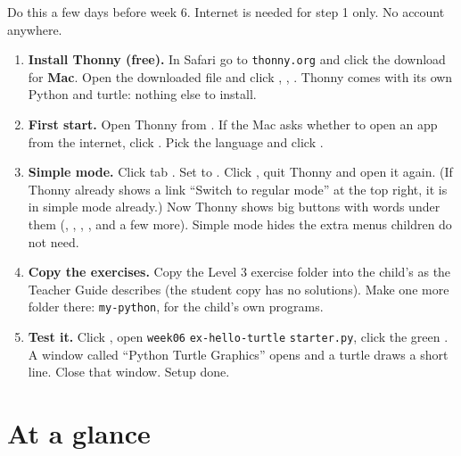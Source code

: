\begin{teachernote}
Do this a few days before week 6. Internet is needed for step 1 only. No account anywhere.
\begin{enumerate}[leftmargin=1.4em,itemsep=1pt]
  \item \textbf{Install Thonny (free).} In Safari go to \texttt{thonny.org} and click the download for \textbf{Mac}. Open the downloaded file and click , , . Thonny comes with its own Python and turtle: nothing else to install.
  \item \textbf{First start.} Open Thonny from . If the Mac asks whether to open an app from the internet, click . Pick the language and click .
  \item \textbf{Simple mode.} Click  \textrightarrow{}  \textrightarrow{} tab . Set  to . Click , quit Thonny and open it again. (If Thonny already shows a link \enquote{Switch to regular mode} at the top right, it is in simple mode already.) Now Thonny shows big buttons with words under them (, , , ,  and a few more). Simple mode hides the extra menus children do not need.
  \item \textbf{Copy the exercises.} Copy the Level 3 exercise folder into the child's  as the Teacher Guide describes (the student copy has no solutions). Make one more folder there: \texttt{my-python}, for the child's own programs.
  \item \textbf{Test it.} Click , open \texttt{week06} \textrightarrow{} \texttt{ex-hello-turtle} \textrightarrow{} \texttt{starter.py}, click the green . A window called \enquote{Python Turtle Graphics} opens and a turtle draws a short line. Close that window. Setup done.
\end{enumerate}
\end{teachernote}

\section{At a glance}
\begin{timeplan}
\end{timeplan}

